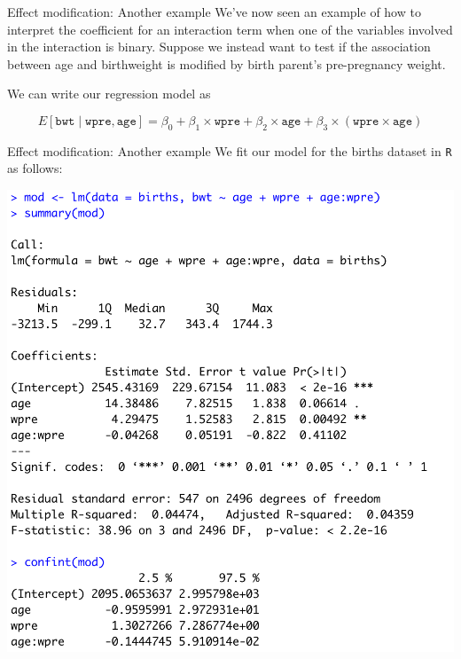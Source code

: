 \documentclass[10pt,t]{beamer}
\begin{document}
\begin{frame}{Effect modification: Another example}
We've now seen an example of how to interpret the coefficient for an interaction term when one of the variables involved in the interaction is binary. Suppose we instead want to test if the association between age and birthweight is modified by birth parent's pre-pregnancy weight. 

\vspace{0.3cm}

We can write our regression model as

$$
E[\texttt{bwt} \mid \texttt{wpre}, \texttt{age}] = \beta_0 + \beta_1 \times \texttt{wpre} + \beta_2 \times \texttt{age} + \beta_3 \times (\texttt{wpre} \times \texttt{age})
$$
\end{frame}

\begin{frame}{Effect modification: Another example}
We fit our model for the births dataset in \texttt{R} as follows:

\vspace{0.3cm}

\centering \includegraphics[scale=0.37]{effectmod2.png}
\end{frame}
\end{document}
